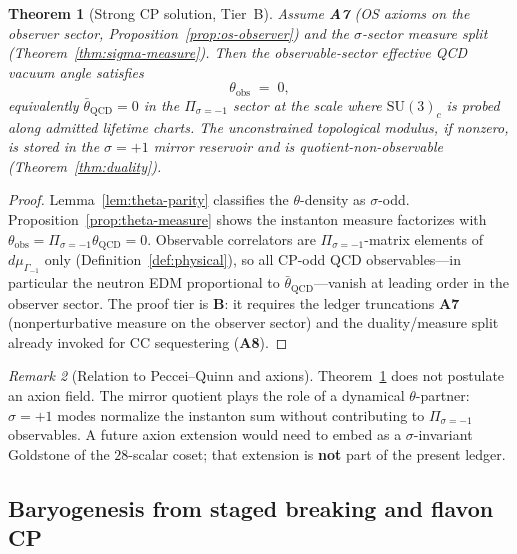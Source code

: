 \documentclass[aps,prd,onecolumn,amsmath,amssymb,nofootinbib,11pt]{revtex4-2}
\numberwithin{equation}{section}
\theoremstyle{plain}
\newtheorem{theorem}{Theorem}[section]
\theoremstyle{definition}
\theoremstyle{remark}
\newtheorem{remark}[theorem]{Remark}
\begin{document}
\begin{theorem}[Strong CP solution, Tier~B]\label{thm:strong-cp}
Assume \textbf{A7} (OS axioms on the observer sector,
Proposition~\ref{prop:os-observer}) and the $\sigma$-sector measure split
(Theorem~\ref{thm:sigma-measure}). Then the observable-sector effective QCD
vacuum angle satisfies
\begin{equation}\label{eq:theta-zero}
  \theta_{\mathrm{obs}} \;=\; 0,
\end{equation}
equivalently $\bar\theta_{\mathrm{QCD}}=0$ in the $\Pi_{\sigma=-1}$ sector
at the scale where $\mathrm{SU}(3)_c$ is probed along admitted lifetime charts.
The unconstrained topological modulus, if nonzero, is stored in the
$\sigma=+1$ mirror reservoir and is quotient-non-observable
(Theorem~\ref{thm:duality}).
\end{theorem}

\begin{proof}
Lemma~\ref{lem:theta-parity} classifies the $\theta$-density as $\sigma$-odd.
Proposition~\ref{prop:theta-measure} shows the instanton measure factorizes
with $\theta_{\mathrm{obs}}=\Pi_{\sigma=-1}\theta_{\mathrm{QCD}}=0$.
Observable correlators are $\Pi_{\sigma=-1}$-matrix elements of
$d\mu_{\Gamma_{-1}}$ only (Definition~\ref{def:physical}), so all
CP-odd QCD observables---in particular the neutron EDM proportional to
$\bar\theta_{\mathrm{QCD}}$---vanish at leading order in the observer sector.
The proof tier is \textbf{B}: it requires the ledger truncations \textbf{A7}
(nonperturbative measure on the observer sector) and the duality/measure split
already invoked for CC sequestering (\textbf{A8}).
\end{proof}

\begin{remark}[Relation to Peccei--Quinn and axions]
Theorem~\ref{thm:strong-cp} does not postulate an axion field. The mirror
quotient plays the role of a dynamical $\theta$-partner: $\sigma=+1$ modes
normalize the instanton sum without contributing to $\Pi_{\sigma=-1}$
observables. A future axion extension would need to embed as a
$\sigma$-invariant Goldstone of the $28$-scalar coset; that extension is
\textbf{not} part of the present ledger.
\end{remark}

\subsection{Baryogenesis from staged breaking and flavon CP}
\label{sec:baryogenesis:sakharov}
\end{document}
